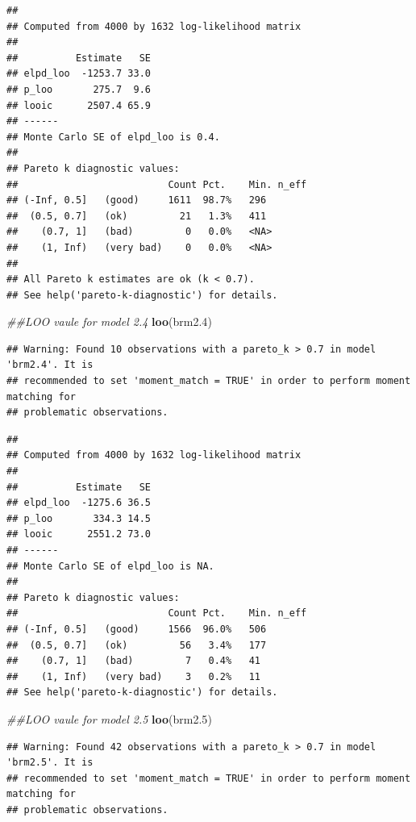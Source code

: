 \documentclass[
]{article}
\newenvironment{Shaded}{\begin{snugshade}}{\end{snugshade}}
\newcommand{\CommentTok}[1]{\textcolor[rgb]{0.56,0.35,0.01}{\textit{#1}}}
\newcommand{\FloatTok}[1]{\textcolor[rgb]{0.00,0.00,0.81}{#1}}
\newcommand{\KeywordTok}[1]{\textcolor[rgb]{0.13,0.29,0.53}{\textbf{#1}}}
\newcommand{\NormalTok}[1]{#1}
\begin{document}
\begin{verbatim}
## 
## Computed from 4000 by 1632 log-likelihood matrix
## 
##          Estimate   SE
## elpd_loo  -1253.7 33.0
## p_loo       275.7  9.6
## looic      2507.4 65.9
## ------
## Monte Carlo SE of elpd_loo is 0.4.
## 
## Pareto k diagnostic values:
##                          Count Pct.    Min. n_eff
## (-Inf, 0.5]   (good)     1611  98.7%   296       
##  (0.5, 0.7]   (ok)         21   1.3%   411       
##    (0.7, 1]   (bad)         0   0.0%   <NA>      
##    (1, Inf)   (very bad)    0   0.0%   <NA>      
## 
## All Pareto k estimates are ok (k < 0.7).
## See help('pareto-k-diagnostic') for details.
\end{verbatim}

\begin{Shaded}
\begin{Highlighting}[]
\CommentTok{##LOO vaule for model 2.4}
\KeywordTok{loo}\NormalTok{(brm2}\FloatTok{.4}\NormalTok{)}
\end{Highlighting}
\end{Shaded}

\begin{verbatim}
## Warning: Found 10 observations with a pareto_k > 0.7 in model 'brm2.4'. It is
## recommended to set 'moment_match = TRUE' in order to perform moment matching for
## problematic observations.
\end{verbatim}

\begin{verbatim}
## 
## Computed from 4000 by 1632 log-likelihood matrix
## 
##          Estimate   SE
## elpd_loo  -1275.6 36.5
## p_loo       334.3 14.5
## looic      2551.2 73.0
## ------
## Monte Carlo SE of elpd_loo is NA.
## 
## Pareto k diagnostic values:
##                          Count Pct.    Min. n_eff
## (-Inf, 0.5]   (good)     1566  96.0%   506       
##  (0.5, 0.7]   (ok)         56   3.4%   177       
##    (0.7, 1]   (bad)         7   0.4%   41        
##    (1, Inf)   (very bad)    3   0.2%   11        
## See help('pareto-k-diagnostic') for details.
\end{verbatim}

\begin{Shaded}
\begin{Highlighting}[]
\CommentTok{##LOO vaule for model 2.5}
\KeywordTok{loo}\NormalTok{(brm2}\FloatTok{.5}\NormalTok{)}
\end{Highlighting}
\end{Shaded}

\begin{verbatim}
## Warning: Found 42 observations with a pareto_k > 0.7 in model 'brm2.5'. It is
## recommended to set 'moment_match = TRUE' in order to perform moment matching for
## problematic observations.
\end{verbatim}
\end{document}
